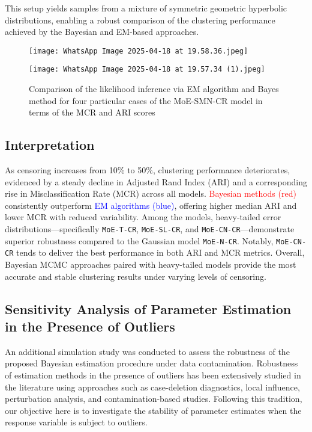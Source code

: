 \documentclass[10.5pt]{article} %
\begin{document}
\noindent
This setup yields samples from a mixture of symmetric geometric hyperbolic distributions, enabling a robust comparison of the clustering performance achieved by the Bayesian and EM-based approaches.

\begin{figure}[h!]
    \centering
    \begin{minipage}{0.48\textwidth}
        \centering
        \texttt{[image: WhatsApp Image 2025-04-18 at 19.58.36.jpeg]}
    \end{minipage}
    \hfill
    \begin{minipage}{0.48\textwidth}
        \centering
        \texttt{[image: WhatsApp Image 2025-04-18 at 19.57.34 (1).jpeg]}
    \end{minipage}
    \caption{Comparison of the likelihood inference via EM algorithm and Bayes method for four particular cases of the MoE-SMN-CR model in terms of the MCR and ARI scores}
\end{figure}
\subsection{Interpretation}

As censoring increases from 10\% to 50\%, clustering performance deteriorates, evidenced by a steady decline in Adjusted Rand Index (ARI) and a corresponding rise in Misclassification Rate (MCR) across all models. \textcolor{red}{Bayesian methods (red)} consistently outperform \textcolor{blue}{EM algorithms (blue)}, offering higher median ARI and lower MCR with reduced variability. Among the models, heavy-tailed error distributions—specifically \texttt{MoE-T-CR}, \texttt{MoE-SL-CR}, and \texttt{MoE-CN-CR}—demonstrate superior robustness compared to the Gaussian model \texttt{MoE-N-CR}. Notably, \texttt{MoE-CN-CR} tends to deliver the best performance in both ARI and MCR metrics. Overall, Bayesian MCMC approaches paired with heavy-tailed models provide the most accurate and stable clustering results under varying levels of censoring.


\subsection{Sensitivity Analysis of Parameter Estimation in the Presence of Outliers}

An additional simulation study was conducted to assess the robustness of the proposed Bayesian estimation procedure under data contamination. Robustness of estimation methods in the presence of outliers has been extensively studied in the literature using approaches such as case-deletion diagnostics, local influence, perturbation analysis, and contamination-based studies. Following this tradition, our objective here is to investigate the stability of parameter estimates when the response variable is subject to outliers.
\end{document}
